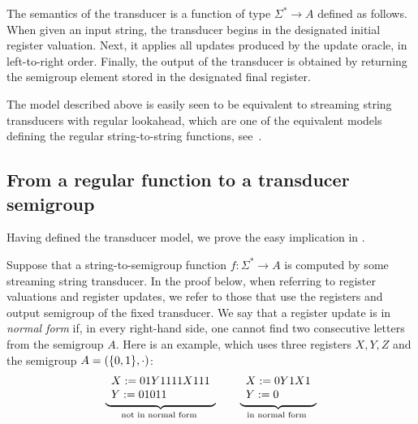 The semantics of the transducer is a function of type $\Sigma^* \to A$ defined as follows. When given an input string, the transducer begins in the designated initial register valuation. Next, it applies all updates produced by the update oracle, in left-to-right order. Finally, the output of the transducer is obtained by returning the semigroup element stored in the designated final register. 

The model described above is easily seen to be equivalent to streaming string transducers with regular lookahead, which are one of the equivalent models defining the regular string-to-string functions, see~\cite[Section 12]{bojanczyk_automata_2018}. 

\subsection{From a regular function to a transducer semigroup}
\label{sec:easy}

Having defined the transducer model, we prove the easy implication  in  . 

Suppose that a string-to-semigroup function $f : \Sigma^* \to A$ is computed by some streaming string transducer. In the proof below, when referring to register valuations and register updates, we refer to those that use the registers and output semigroup of the fixed transducer. We say that a register update is in \emph{normal form} if, in every right-hand side, one cannot find two consecutive letters from the semigroup $A$. Here is an example, which uses three registers $X,Y,Z$ and the semigroup $A = (\{0,1\}, \cdot)$:
\begin{align*}
\myunderbrace{
\begin{array}{l}
    X:= 01Y1111X111\\
Y:= 01011
\end{array}
}{not in normal form}
\qquad 
\myunderbrace{
\begin{array}{l}
    X:= 0Y1X1\\
Y:= 0
\end{array}
}{in normal form}
\end{align*}

